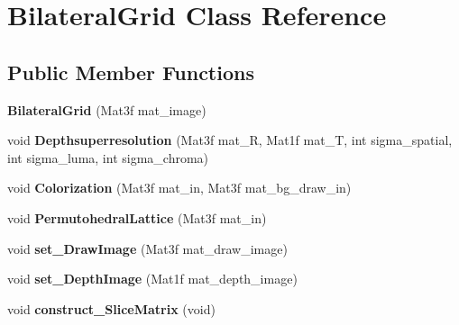 \hypertarget{classBilateralGrid}{}\section{Bilateral\+Grid Class Reference}
\label{classBilateralGrid}
\subsection*{Public Member Functions}
\begin{DoxyCompactItemize}
\item 
{\bfseries Bilateral\+Grid} (Mat3f mat\+\_\+image)\hypertarget{classBilateralGrid_a1e1c37f803f6f1fbf9ce75cb999e72e2}{}\label{classBilateralGrid_a1e1c37f803f6f1fbf9ce75cb999e72e2}

\item 
void {\bfseries Depthsuperresolution} (Mat3f mat\+\_\+R, Mat1f mat\+\_\+T, int sigma\+\_\+spatial, int sigma\+\_\+luma, int sigma\+\_\+chroma)\hypertarget{classBilateralGrid_a4cb7eb9613559c1ff6dd38b4b18b39b5}{}\label{classBilateralGrid_a4cb7eb9613559c1ff6dd38b4b18b39b5}

\item 
void {\bfseries Colorization} (Mat3f mat\+\_\+in, Mat3f mat\+\_\+bg\+\_\+draw\+\_\+in)\hypertarget{classBilateralGrid_ad902695cabed0ecafe4237f84a1989b4}{}\label{classBilateralGrid_ad902695cabed0ecafe4237f84a1989b4}

\item 
void {\bfseries Permutohedral\+Lattice} (Mat3f mat\+\_\+in)\hypertarget{classBilateralGrid_a93079277bd1c2e12cbc4d087f3222c7b}{}\label{classBilateralGrid_a93079277bd1c2e12cbc4d087f3222c7b}

\item 
void {\bfseries set\+\_\+\+Draw\+Image} (Mat3f mat\+\_\+draw\+\_\+image)\hypertarget{classBilateralGrid_ac04cb21d31b6698f6aa60ae6cc2bbe34}{}\label{classBilateralGrid_ac04cb21d31b6698f6aa60ae6cc2bbe34}

\item 
void {\bfseries set\+\_\+\+Depth\+Image} (Mat1f mat\+\_\+depth\+\_\+image)\hypertarget{classBilateralGrid_a7ad1f4ecc735e43bbfcc337336ab10bf}{}\label{classBilateralGrid_a7ad1f4ecc735e43bbfcc337336ab10bf}

\item 
void {\bfseries construct\+\_\+\+Slice\+Matrix} (void)\hypertarget{classBilateralGrid_a3133f8c767f4065da5832d54bb7d9278}{}\label{classBilateralGrid_a3133f8c767f4065da5832d54bb7d9278}


\end{DoxyCompactItemize}

